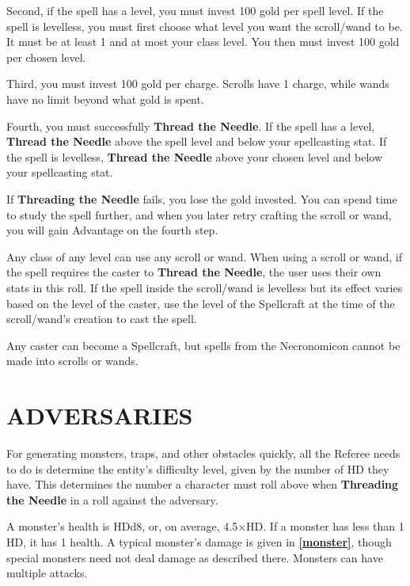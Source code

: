 \documentclass[twoside]{article}
\newcommand{\TTN}[2]{\textbf{Thread the Needle} above #1 and below #2}
\newcommand{\mysection}[1]{\phantomsection\section*{#1}\addcontentsline{toc}{section}{#1}}
\newcommand{\boldref}[1]{\textbf{\hyperref[#1]{\cref{#1}}}}
\begin{document}
Second, if the spell has a level, you must invest 100 gold per spell level. If the spell is levelless, you must first choose what level you want the scroll/wand to be. It must be at least 1 and at most your class level. You then must invest 100 gold per chosen level. 

Third, you must invest 100 gold per charge. Scrolls have 1 charge, while wands have no limit beyond what gold is spent. 

Fourth, you must successfully \textbf{Thread the Needle}. If the spell has a level, \TTN{the spell level}{your spellcasting stat}. If the spell is levelless, \TTN{your chosen level}{your spellcasting stat}. 

If \textbf{Threading the Needle} fails, you lose the gold invested. You can spend time to study the spell further, and when you later retry crafting the scroll or wand, you will gain Advantage on the fourth step. 

\bigbreak

Any class of any level can use any scroll or wand. When using a scroll or wand, if the spell requires the caster to \textbf{Thread the Needle}, the user uses their own stats in this roll. If the spell inside the scroll/wand is levelless but its effect varies based on the level of the caster, use the level of the Spellcraft at the time of the scroll/wand's creation to cast the spell. 

\bigbreak

Any caster can become a Spellcraft, but spells from the Necronomicon cannot be made into scrolls or wands.

\mysection{ADVERSARIES}

For generating monsters, traps, and other obstacles quickly, all the Referee needs to do is determine the entity's difficulty level, given by the number of HD they have. This determines the number a character must roll above when \textbf{Threading the Needle} in a roll against the adversary. 

\bigbreak

A monster's health is HDd8, or, on average, 4.5$\times$HD. If a monster has less than 1 HD, it has 1 health. A typical monster's damage is given in \boldref{monster}, though special monsters need not deal damage as described there. Monsters can have multiple attacks.

\bigbreak
\end{document}
